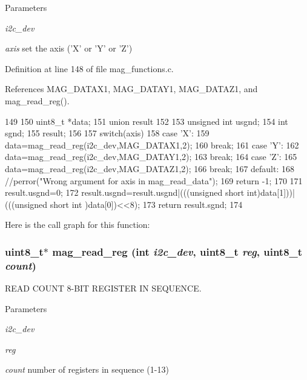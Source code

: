 \begin{DoxyParams}{Parameters}
\item[{\em i2c\_\-dev}]\item[{\em axis}]set the axis ('X' or 'Y' or 'Z') \end{DoxyParams}


Definition at line 148 of file mag\_\-functions.c.



References MAG\_\-DATAX1, MAG\_\-DATAY1, MAG\_\-DATAZ1, and mag\_\-read\_\-reg().




\begin{DoxyCode}
149 {
150   uint8_t *data;
151   union result
152   {
153     unsigned int usgnd;
154     int sgnd;
155   }result;
156 
157   switch(axis){
158     case 'X':
159       data=mag_read_reg(i2c_dev,MAG_DATAX1,2);
160       break;
161     case 'Y':
162       data=mag_read_reg(i2c_dev,MAG_DATAY1,2);
163       break;
164     case 'Z':
165       data=mag_read_reg(i2c_dev,MAG_DATAZ1,2);
166       break;
167     default:
168       //perror("Wrong argument for axis in mag_read_data");
169       return -1;
170   }
171   result.usgnd=0;
172   result.usgnd=result.usgnd|(((unsigned short int)data[1]))|(((unsigned short int
      )data[0])<<8);
173   return result.sgnd;
174 }
\end{DoxyCode}




Here is the call graph for this function:

\hypertarget{group__mag_ga6830eaeae2298320e1e8c902e4edd709}{
\subsubsection[{mag\_\-read\_\-reg}]{\setlength{\rightskip}{0pt plus 5cm}uint8\_\-t$\ast$ mag\_\-read\_\-reg (int {\em i2c\_\-dev}, \/  uint8\_\-t {\em reg}, \/  uint8\_\-t {\em count})}}
\label{group__mag_ga6830eaeae2298320e1e8c902e4edd709}


READ COUNT 8-\/BIT REGISTER IN SEQUENCE. 


\begin{DoxyParams}{Parameters}
\item[{\em i2c\_\-dev}]\item[{\em reg}]\item[{\em count}]number of registers in sequence (1-\/13) \end{DoxyParams}



